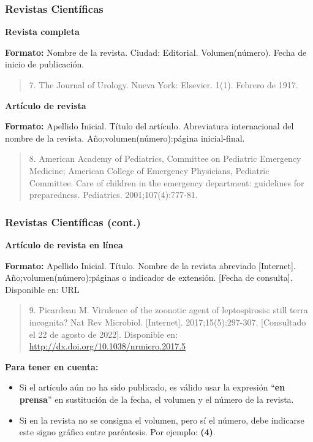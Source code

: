 \documentclass[
11pt, %
]{beamer}
\begin{document}
\begin{frame}
	\frametitle{Revistas Científicas}

	\textbf{Revista completa}


	\textbf{Formato:} Nombre de la revista. Ciudad: Editorial. Volumen(número). Fecha de inicio de publicación.
	\begin{quote}
		7. The Journal of Urology. Nueva York: Elsevier. 1(1). Febrero de 1917.
	\end{quote}


	\textbf{Artículo de revista}

	\textbf{Formato:} Apellido Inicial. Título del artículo. Abreviatura internacional del nombre de la revista. Año;volumen(número):página inicial-final.

	\begin{quote}
		8. American Academy of Pediatrics, Committee on Pediatric Emergency Medicine; American College of Emergency Physicians, Pediatric Committee. Care of children in the emergency department: guidelines for preparedness. Pediatrics. 2001;107(4):777-81.
	\end{quote}


\end{frame}

\begin{frame}
	\frametitle{Revistas Científicas (cont.)}

	\textbf{Artículo de revista en línea}

	\textbf{Formato:} Apellido Inicial. Título. Nombre de la revista abreviado [Internet]. Año;volumen(número):páginas o indicador de extensión. [Fecha de consulta]. Disponible en: URL

	\begin{quote}
		9.  Picardeau M. Virulence of the zoonotic agent of leptospirosis: still terra incognita? Nat Rev Microbiol. [Internet]. 2017;15(5):297-307. [Consultado el 22 de agosto de 2022]. Disponible en: \url{http://dx.doi.org/10.1038/nrmicro.2017.5}
	\end{quote}


	\textbf{Para tener en cuenta:}
	\begin{itemize}
		\item Si el artículo aún no ha sido publicado, es válido usar la expresión “\textbf{en prensa}” en sustitución de la fecha, el volumen y el número de la revista.
		\item Si en la revista no se consigna el volumen, pero sí el número, debe indicarse este signo gráfico entre paréntesis. Por ejemplo: \textbf{(4)}.
	\end{itemize}

\end{frame}
\end{document}
